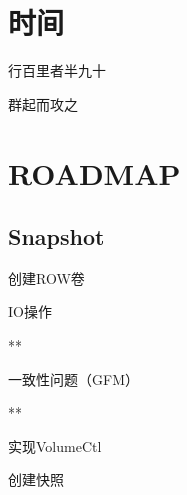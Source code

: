 \section{时间}

行百里者半九十

群起而攻之

\section{ROADMAP}

\subsection{Snapshot}

\begin{enumbox}
\item 创建ROW卷
\item IO操作
\item ***
\item 一致性问题（GFM）
\item ***
\item 实现VolumeCtl
\item 创建快照
\end{enumbox}
